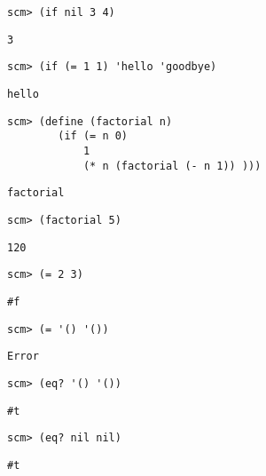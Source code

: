 \documentclass{exam}
\begin{document}
\begin{questions}
\begin{blocksection}
\begin{lstlisting}
scm> (if nil 3 4)
\end{lstlisting}
\begin{solution}[.25in]
\texttt{3}
\end{solution}

\begin{lstlisting}
scm> (if (= 1 1) 'hello 'goodbye)
\end{lstlisting}
\begin{solution}[.25in]
\texttt{hello}
\end{solution}
\end{blocksection}

\begin{blocksection}
\begin{lstlisting}
scm> (define (factorial n)
        (if (= n 0)
            1
            (* n (factorial (- n 1)) )))
\end{lstlisting}
\begin{solution}[.25in]
\texttt{factorial}
\end{solution}

\begin{lstlisting}
scm> (factorial 5)
\end{lstlisting}
\begin{solution}[.25in]
\texttt{120}
\end{solution}

\begin{lstlisting}
scm> (= 2 3)
\end{lstlisting}
\begin{solution}[.25in]
\texttt{\#f}
\end{solution}

\begin{lstlisting}
scm> (= '() '())
\end{lstlisting}
\begin{solution}[.25in]
\texttt{Error}
\end{solution}

\begin{lstlisting}
scm> (eq? '() '())
\end{lstlisting}
\begin{solution}[.25in]
\texttt{\#t}
\end{solution}

\begin{lstlisting}
scm> (eq? nil nil)
\end{lstlisting}
\begin{solution}[.25in]
\texttt{\#t}
\end{solution}


\end{blocksection}
\end{questions}
\end{document}
